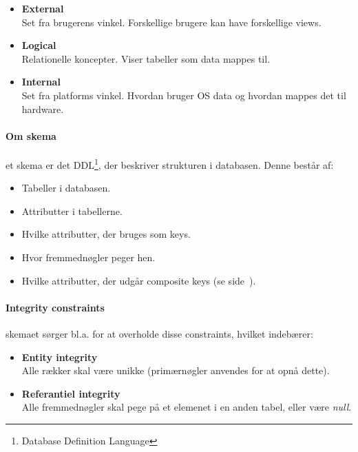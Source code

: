 \begin{itemize}
	\item \textbf{External}\\
	Set fra brugerens vinkel. Forskellige brugere kan have forskellige views.
	\item \textbf{Logical}\\
	Relationelle koncepter. Viser tabeller som data mappes til.
	\item \textbf{Internal}\\
	Set fra platforms vinkel. Hvordan bruger OS data og hvordan mappes det til hardware.
\end{itemize}

\paragraph{Om skema} et skema er det DDL\footnote{Database Definition Language}, der beskriver strukturen i databasen. Denne består af:

\begin{itemize}
	\item Tabeller i databasen.
	\item Attributter i tabellerne.
	\item Hvilke attributter, der bruges som keys.
	\item Hvor fremmednøgler peger hen.
	\item Hvilke attributter, der udgår composite keys (se side~\pageref{sec:keys}).
\end{itemize}

\paragraph{Integrity constraints} skemaet sørger bl.a. for at overholde disse constraints, hvilket indebærer:

\begin{itemize}
	\item \textbf{Entity integrity}\\
	Alle rækker skal være unikke (primærnøgler anvendes for at opnå dette).
	\item \textbf{Referantiel integrity}\\
	Alle fremmednøgler skal pege på et elemenet i en anden tabel, eller være \textit{null}.
\end{itemize}



























